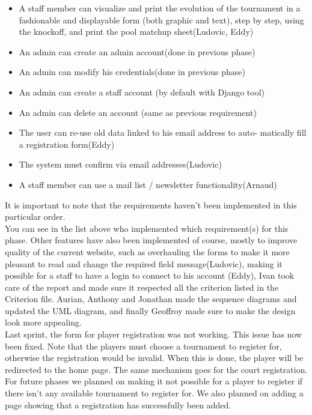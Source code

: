 \documentclass[a4paper, 12pt]{article}
\begin{document}
\begin{itemize}
 
\item A staff member can visualize and print the evolution of the tournament in a fashionable and displayable form (both graphic and text), step by step, using the knockoff, and print the pool matchup sheet(Ludovic, Eddy)
\item An admin can create an admin account(done in previous phase)
\item An admin can modify his credentials(done in previous phase)
\item An admin can create a staff account (by default with Django tool)
\item An admin can delete an account (same as previous requirement)
\item The user can re-use old data linked to his email address to auto- matically fill a registration form(Eddy)
\item The system must confirm via email addresses(Ludovic)
\item A staff member can use a mail list / newsletter functionality(Arnaud)
\\
\end{itemize}

It is important to note that the requirements haven't been implemented in this particular order.\\

You can see in the list above who implemented which requirement(s) for this phase. Other features have also been implemented of course, mostly to improve quality of the current website, such as overhauling the forms to make it more pleasant to read and change the required field message(Ludovic), making it possible for a staff to have a login to connect to his account (Eddy), Ivan took care of the report and made sure it respected all the criterion listed in the Criterion file. Aurian, Anthony and Jonathan made the sequence diagrams and updated the UML diagram, and finally Geoffroy made sure to make the design look more appealing.\\

Last sprint, the form for player registration was not working. This issue has now been fixed. Note that the players must choose a tournament to register for, otherwise the registration would be invalid. When this is done, the player will be redirected to the home page. The same mechanism goes for the court registration.  For future phases we planned on making it not possible for a player to register if there isn't any available tournament to register for. We also planned on adding a page showing that a registration has successfully been added.\\
\end{document}
